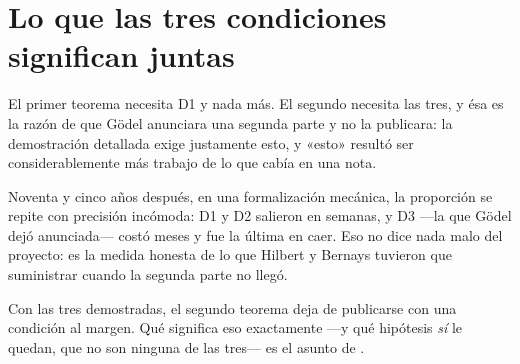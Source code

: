 \section{Lo que las tres condiciones significan juntas}

\begin{leccion}
El primer teorema necesita D1 y nada más. El segundo necesita las tres, y ésa es la razón de que
Gödel anunciara una segunda parte y no la publicara: la demostración detallada exige justamente
esto, y «esto» resultó ser considerablemente más trabajo de lo que cabía en una nota.

Noventa y cinco años después, en una formalización mecánica, la proporción se repite con precisión
incómoda: D1 y D2 salieron en semanas, y D3 —la que Gödel dejó anunciada— costó meses y fue la
última en caer. Eso no dice nada malo del proyecto: es la medida honesta de lo que Hilbert y
Bernays tuvieron que suministrar cuando la segunda parte no llegó.

Con las tres demostradas, el segundo teorema deja de publicarse con una condición al margen. Qué
significa eso exactamente —y qué hipótesis \emph{sí} le quedan, que no son ninguna de las
tres— es el asunto de .
\end{leccion}
